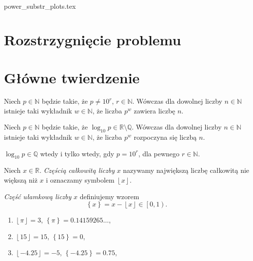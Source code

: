 \documentclass{beamer}
\newcommand{\enumsymbol}{$\triangleright$}
\newcommand{\R}{\mathbb{R}}
\newcommand{\Q}{\mathbb{Q}}
\newcommand{\N}{\mathbb{N}}
\newcommand{\define}[1]{\textit{#1}}
\newcommand{\floor}[1]{\left\lfloor #1 \right\rfloor}
\newcommand{\fracpart}[1]{\left\{ #1 \right\}}
\begin{document}
{power_substr_plots.tex}



\section{Rozstrzygnięcie problemu}
\section{Główne twierdzenie}

\begin{frame}
  \begin{theorem}
    Niech $p \in \N$ będzie takie, że $p \not = 10^r$, $r \in \N$.
    Wówczas dla dowolnej liczby $n \in \N$ istnieje taki wykładnik $w \in \N$, że liczba $p^w$ zawiera liczbę $n$.
  \end{theorem}
  \begin{lemma}
    \label{lemma::powers_beginb_with_every_string}
    Niech $p \in \N$ będzie takie, że $\log_{10}p \in \R \setminus \Q$.
    Wówczas dla dowolnej liczby $n \in \N$ istnieje taki wykładnik $w \in \N$, że liczba $p^w$ rozpoczyna się liczbą $n$. 
  \end{lemma}
  \begin{lemma}
    \label{lemma::log_10_irrational_iff}
    $\log_{10}p \in \Q$ wtedy i tylko wtedy, gdy $p = 10^r$, dla pewnego $r \in \N$.
  \end{lemma}
\end{frame}

\begin{frame}
\begin{definition}
Niech $x \in \R$.
\define{Częścią całkowitą liczby} $x$ nazywamy największą liczbę całkowitą nie większą niż $x$ i oznaczamy symbolem $\floor{x}$.

\define{Część ułamkową liczby} $x$ definiujemy wzorem
\begin{equation*}
\fracpart{x} = x-\floor{x} \in \left[0, 1\right).
\end{equation*}
\end{definition}
\begin{example}
  \begin{enumerate}[label=\enumsymbol]
    \item $\floor{\pi} = 3$, $\fracpart{\pi} = 0.14159265\ldots{}$,
    \item $\floor{15} = 15$, $\fracpart{15} = 0$,
    \item $\floor{-4.25} = -5$, $\fracpart{-4.25} = 0.75$, 
  \end{enumerate}
\end{example}
\end{frame}
\end{document}
